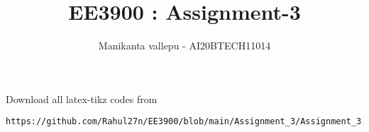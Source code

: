 \documentclass[journal,12pt,twocolumn]{IEEEtran}
\DeclareMathOperator*{\Res}{Res}
\begin{document}
\newcommand{\BEQA}{\begin{eqnarray}}
\newcommand{\EEQA}{\end{eqnarray}}
\newcommand{\define}{\stackrel{\triangle}{=}}

\raggedbottom
\setlength{\parindent}{0pt}
\providecommand{\mbf}{\mathbf}
\providecommand{\pr}[1]{\ensuremath{\Pr\left(#1\right)}}
\providecommand{\qfunc}[1]{\ensuremath{Q\left(#1\right)}}
\providecommand{\sbrak}[1]{\ensuremath{{}\left[#1\right]}}
\providecommand{\lsbrak}[1]{\ensuremath{{}\left[#1\right.}}
\providecommand{\rsbrak}[1]{\ensuremath{{}\left.#1\right]}}
\providecommand{\brak}[1]{\ensuremath{\left(#1\right)}}
\providecommand{\lbrak}[1]{\ensuremath{\left(#1\right.}}
\providecommand{\rbrak}[1]{\ensuremath{\left.#1\right)}}
\providecommand{\cbrak}[1]{\ensuremath{\left\{#1\right\}}}
\providecommand{\lcbrak}[1]{\ensuremath{\left\{#1\right.}}
\providecommand{\rcbrak}[1]{\ensuremath{\left.#1\right\}}}
\theoremstyle{remark}
\newtheorem{rem}{Remark}
\newcommand{\sgn}{\mathop{\mathrm{sgn}}}
\providecommand{\abs}[1]{\vert#1\vert}
\providecommand{\res}[1]{\Res\displaylimits_{#1}} 
\providecommand{\norm}[1]{\lVert#1\rVert}
\providecommand{\mtx}[1]{\mathbf{#1}}
\providecommand{\mean}[1]{E[ #1 ]}
\providecommand{\fourier}{\overset{\mathcal{F}}{ \rightleftharpoons}}
\providecommand{\system}{\overset{\mathcal{H}}{ \longleftrightarrow}}
\newcommand{\solution}{\noindent \textbf{Solution: }}
\newcommand{\cosec}{\,\text{cosec}\,}
\providecommand{\dec}[2]{\ensuremath{\overset{#1}{\underset{#2}{\gtrless}}}}
\newcommand{\myvec}[1]{\ensuremath{\begin{pmatrix}#1\end{pmatrix}}}
\newcommand{\mydet}[1]{\ensuremath{\begin{vmatrix}#1\end{vmatrix}}}
\makeatletter
{}
\makeatother
\let\StandardTheFigure\thefigure
\let\vec\mathbf
\renewcommand{\thefigure}{\theproblem}
\def\putbox#1#2#3{\makebox[0in][l]{\makebox[#1][l]{}\raisebox{\baselineskip}[0in][0in]{\raisebox{#2}[0in][0in]{#3}}}}
     \def\rightbox#1{\makebox[0in][r]{#1}}
     \def\centbox#1{\makebox[0in]{#1}}
     \def\topbox#1{\raisebox{-\baselineskip}[0in][0in]{#1}}
     \def\midbox#1{\raisebox{-0.5\baselineskip}[0in][0in]{#1}}
\vspace{3cm}
\title{ EE3900 : Assignment-3}
\author{Manikanta vallepu - AI20BTECH11014}
\maketitle
\newpage
\bigskip
\renewcommand{\thefigure}{\theenumi}
\renewcommand{\thetable}{\theenumi}
\newcommand{\R}{\mathbb{R}}
Download all  latex-tikz codes from 
\begin{lstlisting}
https://github.com/Rahul27n/EE3900/blob/main/Assignment_3/Assignment_3.py
\end{lstlisting}
\vspace{0.5cm}
\end{document}
